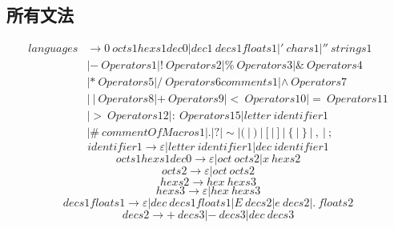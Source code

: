 \documentclass[UTF8]{ctexart}
\begin{document}
\subsection{所有文法}
\begin{equation}
	\begin{aligned}
		languages & \rightarrow 0 \ octs1hexs1dec0 | dec1 \ decs1floats1 | ' \ chars1 | '' \ strings1                                   \\
		          & | - \ Operators1 | ! \ Operators2 | \% \ Operators3  | \& \ Operators4                                              \\
		          & | * \ Operators5  | / \ Operators6comments1 | \wedge \ Operators7                                                   \\
		          & | \ | \ Operators8 | + \ Operators9  | < \ Operators10 | = \ Operators11                                            \\
		          & | > \ Operators12  | \colon \ Operators15 | letter \ identifier1                                                    \\
		          & | \# \ commentOfMacros1  | . | ? | \sim | (  \ | \  )  \ | \  [  \ | \  ]  \ | \  \{  \ | \  \}  \ | \  ,  \ | \  ;
	\end{aligned}
\end{equation}
\begin{equation}
	identifier1 \rightarrow \varepsilon | letter \ identifier1 | dec \ identifier1
\end{equation}
\begin{equation}
	octs1hexs1dec0 \rightarrow \varepsilon | oct \ octs2 | x \ hexs2
\end{equation}
\begin{equation}
	octs2 \rightarrow \varepsilon | oct \ octs2
\end{equation}
\begin{equation}
	hexs2 \rightarrow hex \ hexs3
\end{equation}
\begin{equation}
	hexs3 \rightarrow \varepsilon | hex \ hexs3
\end{equation}
\begin{equation}
	decs1floats1 \rightarrow \varepsilon | dec \ decs1floats1 | E \ decs2 | e \ decs2 | . \ floats2
\end{equation}
\begin{equation}
	decs2 \rightarrow + \ decs3 | - \ decs3 | dec \ decs3
\end{equation}
\end{document}
